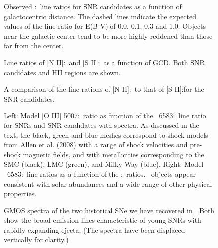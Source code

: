 \begin{figure}
\caption{Observed \hb:\ha\ line ratios for SNR candidates as a function of galactocentric distance. The dashed lines indicate the expected values of the line ratio for E(B-V) of 0.0, 0.1, 0.3 and 1.0.  Objects near the galactic center tend to be more highly reddened than those far from the center. \label{fig_reddening}}
\end{figure}

\begin{figure}
\caption{Line ratios of [N II]:\ha\ and [S II]:\ha\ as a function of GCD.  Both SNR candidates and HII regions are shown.     \label{fig_metal_ratios}}

\end{figure}

\begin{figure}
\caption{A comparison of the line rations of [N II]:\ha\ to that of [S II]:\ha for the SNR candidates. \label{fig_s2_n2}}
\end{figure}


\begin{figure}
\caption{Left: Model [O III] 5007:\hb\ ratio as function of the \nii\ 6583:\ha\ line ratio for SNRs and SNR candidates with spectra. As discussed in the text, the black, green and blue meshes correspond to shock models from Allen et al. (2008) with a range of shock velocities and pre-shock magnetic fields, and with metallicities corresponding to the SMC (black), LMC (green), and Milky Way (blue).  Right: Model \nii\ 6583:\ha\ line ratios as a function of the \sii:\ha\ ratios.  \gal\ objects appear consistent with solar abundances and a wide range of other physical properties.  \label{fig_model}}
\end{figure}

\begin{figure}
\caption{GMOS spectra of the two historical SNe we have recovered in \gal.  Both show the broad emission lines characteristic of young SNRs with rapidly expanding ejecta.  (The spectra have been displaced vertically for clarity.) \label{historical_SNe}}
\end{figure}


\vspace{5mm}


